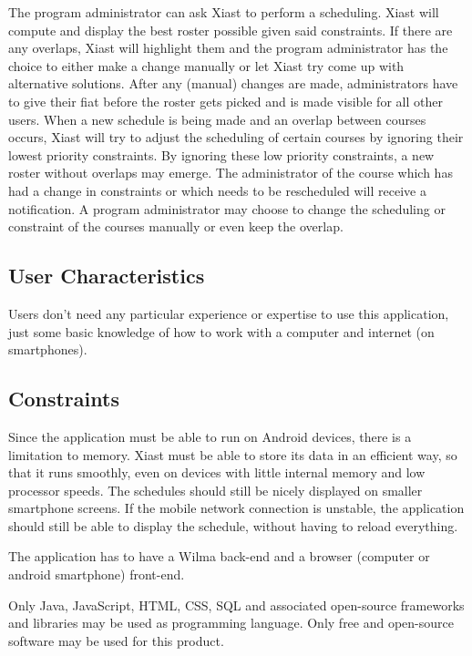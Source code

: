 \documentclass[12pt]{article}
\begin{document}
The program administrator can ask Xiast to perform a scheduling. Xiast
will compute and display the best roster possible given said
constraints. If there are any overlaps, Xiast will highlight them and
the program administrator has the choice to either make a change
manually or let Xiast try come up with alternative solutions. After any
(manual) changes are made, administrators have to give their fiat before
the roster gets picked and is made visible for all other users. When a
new schedule is being made and an overlap between courses occurs, Xiast
will try to adjust the scheduling of certain courses by ignoring their
lowest priority constraints. By ignoring these low priority constraints,
a new roster without overlaps may emerge. The administrator of the
course which has had a change in constraints or which needs to be
rescheduled will receive a notification. A program administrator may
choose to change the scheduling or constraint of the courses manually or
even keep the overlap.

\subsection{User Characteristics}\label{user-characteristics}

Users don't need any particular experience or expertise to use this
application, just some basic knowledge of how to work with a computer
and internet (on smartphones).

\subsection{Constraints}\label{constraints}

Since the application must be able to run on Android devices, there is a
limitation to memory. Xiast must be able to store its data in an
efficient way, so that it runs smoothly, even on devices with little
internal memory and low processor speeds. The schedules should still be
nicely displayed on smaller smartphone screens. If the mobile network
connection is unstable, the application should still be able to display
the schedule, without having to reload everything.

The application has to have a Wilma back-end and a browser (computer or
android smartphone) front-end.

Only Java, JavaScript, HTML, CSS, SQL and associated open-source
frameworks and libraries may be used as programming language. Only free
and open-source software may be used for this product.
\end{document}
